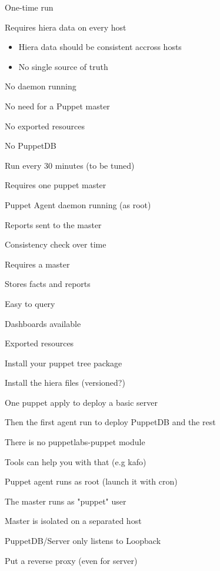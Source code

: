 \begin{iframe}
\item One-time run
\item Requires hiera data on every host
\begin{itemize}
    \item Hiera data should be consistent accross hosts
    \item No single source of truth
\end{itemize}
\item No daemon running
\item No need for a Puppet master
\item No exported resources
\item No PuppetDB
\end{iframe}
\begin{iframe}
\item Run every 30 minutes (to be tuned)
\item Requires one puppet master
\item Puppet Agent daemon running (as root)
\item Reports sent to the master
\item Consistency check over time
\end{iframe}

\begin{iframe}[PuppetDB]
\item Requires a master
\item Stores facts and reports
\item Easy to query
\item Dashboards available
\item Exported resources
\end{iframe}

\begin{iframe}
\item Install your puppet tree package
\item Install the hiera files (versioned?)
\item One puppet apply to deploy a basic server
\item Then the first agent run to deploy PuppetDB and the rest
\item There is no puppetlabs-puppet module
\item Tools can help you with that (e.g kafo)
\end{iframe}


\begin{iframe}[Security]
\item Puppet agent runs as root (launch it with cron)
\item The master runs as "puppet" user
\item Master is isolated on a separated host
\item PuppetDB/Server only listens to Loopback
\item Put a reverse proxy (even for server)
\end{iframe}

